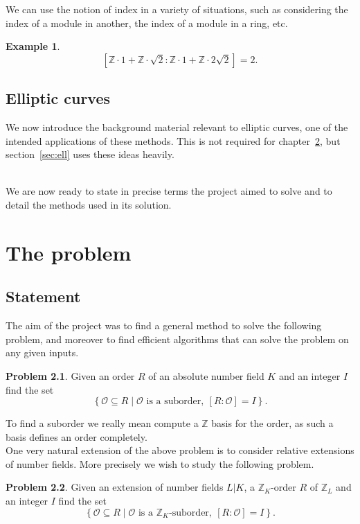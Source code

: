 \documentclass[a4paper,abstracton]{scrreprt}
\theoremstyle{definition}
\newtheorem{prob}{Problem}
\newtheorem{ex}{Example}
\newcommand{\ZZ}{\mathbb{Z}}
\renewcommand{\O}{\mathcal{O}}
\begin{document}
We can use the notion of index in a variety of situations, such as considering the index of a module in another, the index of a module in a ring, etc.

\begin{ex}
\[[\ZZ\cdot 1 + \ZZ\cdot \sqrt{2} \colon \ZZ \cdot 1 + \ZZ \cdot 2\sqrt{2}] = 2.\]
\end{ex}

\section{Elliptic curves}
We now introduce the background material relevant to elliptic curves, one of the intended applications of these methods.
This is not required for chapter~\ref{chap:prob}, but section~\ref{sec:ell} uses these ideas heavily.

~\\
We are now ready to state in precise terms the project aimed to solve and to detail the methods used in its solution.

\chapter{The problem}
\label{chap:prob}
\section{Statement}
\label{sec:statements}

The aim of the project was to find a general method to solve the following problem, and moreover to find efficient algorithms that can solve the problem on any given inputs.

\begin{prob}
Given an order $R$ of an absolute number field $K$ and an integer $I$ find the set
\[\left\{ \O\subseteq R \mid \O\text{ is a suborder},\ [R\colon\O] = I\right\}.\]
\end{prob}

To find a suborder we really mean compute a $\ZZ$ basis for the order, as such a basis defines an order completely.\\

One very natural extension of the above problem is to consider relative extensions of number fields.
More precisely we wish to study the following problem.

\begin{prob} %
Given an extension of number fields $L|K$, a $\ZZ_K$-order $R$ of $\ZZ_L$ and an integer $I$ find the set
\[\left\{ \O\subseteq R \mid \O\text{ is a $\ZZ_K$-suborder},\ [R\colon\O] = I\right\}.\]
\end{prob}
\end{document}
